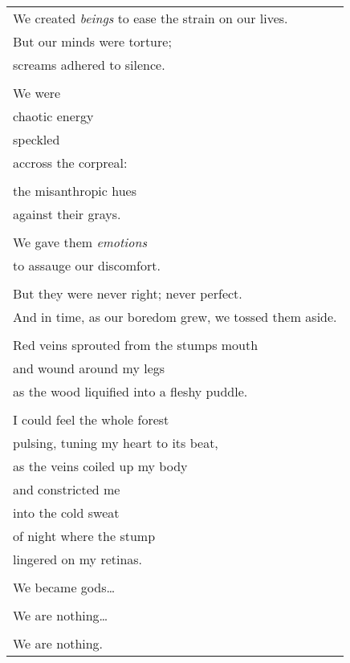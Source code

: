 \documentclass{article}
\begin{document}
\begin{center}
\begin{tabular}{l}
\hspace*{4ex}We created \textit{beings} to ease the strain on our lives. \\
\hspace*{4ex}But our minds were torture;\\
\hspace*{4ex}screams adhered to silence. \\
\\
\hspace*{4ex}We were \\
\hspace*{4ex}chaotic energy \\
\hspace*{4ex}speckled \\
\hspace*{4ex}accross the corpreal: \\
\\
\hspace*{4ex}the misanthropic hues \\
\hspace*{4ex}against their grays. \\
\\
\hspace*{4ex}We gave them \textit{emotions} \\
\hspace*{4ex}to assauge our discomfort. \\
\\
\hspace*{4ex}But they were never right; never perfect. \\
\hspace*{4ex}And in time, as our boredom grew, we tossed them aside. \\
\\
Red veins sprouted from the stumps mouth \\
and wound around my legs \\
as the wood liquified into a fleshy puddle. \\
\\
I could feel the whole forest \\
pulsing, tuning my heart to its beat, \\
as the veins coiled up my body \\
and constricted me \\
into the cold sweat \\
of night where the stump \\
lingered on my retinas. \\
\\
\hspace*{4ex}We became gods\ldots \\
\\
\hspace*{4ex}We are nothing\ldots \\
\\
\hspace*{4ex}We are nothing.
\end{tabular}
\end{center}
\end{document}
